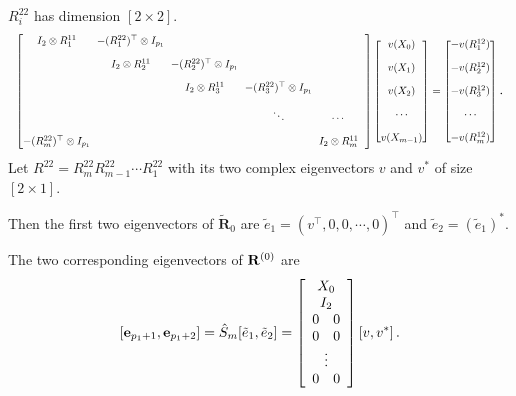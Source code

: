 \documentclass[mathserif, handout]{beamer}
\begin{document}
\begin{frame}[allowframebreaks]
\begin{itemize}
       $R^{22}_i$ has dimension $[2\!\times\! 2]$.
       \begin{equation}
         \label{eq:xdpsdcomplex}
         \resizebox{\linewidth}{!}{%
           $
           \setlength{\arraycolsep}{3pt}
           \begin{bmatrix}
             I_{2}\otimes R^{11}_{1} & -(R^{22}_{1})^\top \otimes I_{p_{1}} &  & \\[1em]
             & I_{2}\otimes R^{11}_{2} & -(R^{22}_{2})^\top  \otimes I_{p_{1}} &  &\\[1em]
             &  & I_{2}\otimes R^{11}_{3} & -(R^{22}_{3})^\top \otimes I_{p_{1}} &  &\\[1em]
             & & & \ddots &\cdots & \\[1em]
             -(R^{22}_{m})^\top \otimes I_{p_{1}} & & & & I_{2}\otimes R^{11}_{m}
           \end{bmatrix}
           \begin{bmatrix}
             v(X_{0}) \\[1em]
             v(X_{1})  \\[1em]
             v(X_{2})  \\[1em]
             \cdots \\[1em]
             v(X_{m-1})
           \end{bmatrix}
           =
           \begin{bmatrix}
             -v(R^{12}_{1}) \\[1em]
             -v(R^{12}_{2}) \\[1em]
             -v(R^{12}_{3}) \\[1em]
             \cdots \\[1em]
             -v(R^{12}_{m})
           \end{bmatrix} $%
         }
         \,.
       \end{equation}
       Let $R^{22}=R^{22}_{m}R^{22}_{m-1}\cdots R^{22}_{1}$ with its two complex
       eigenvectors $v$ and $v^{*}$ of size $[2\!\times\! 1]$.

       Then the first two eigenvectors of  $\mathbf{\tilde{R}}_{0}$ are
       $\tilde{e}_{1}=(v^\top,0,0,\cdots,0)^\top $ and
       $\tilde{e}_{2}=(\tilde{e}_{1})^{*}$.

       The two corresponding eigenvectors of $\ps{R}{0}$ are
       \[
       \left[\jEigvec[p_{1}+1],\jEigvec[p_{1}+2]\right]
       =\hat{S}_{m}[\tilde{e}_{1},\tilde{e}_{2}]
       = \left[
         \begin{array}{c}
           X_{0} \\
           I_{2}    \\
           0 \quad 0\\
           0 \quad 0\\
           \vdots\\
           0 \quad 0
         \end{array}
       \right]
       [v,v^{*}]
       \,.
       \]


\end{itemize}
\end{frame}
\end{document}
